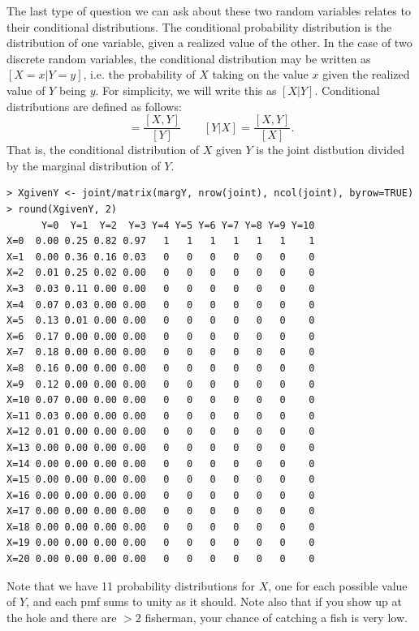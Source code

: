 The last type of question we can ask about these two random variables
relates to their conditional distributions. The
conditional probability distribution is the distribution of one
variable, given a realized value of the other. In the case of two discrete random
variables, the conditional distribution may be written as
$[X=x|Y=y]$, i.e. the probability of $X$ taking on the value $x$
given the realized value of $Y$ being $y$. For simplicity, we will
write this as $[X|Y]$. Conditional distributions are defined as follows:
\begin{equation*}
  [X|Y] = \frac{[X,Y]}{[Y]} \qquad [Y|X] = \frac{[X,Y]}{[X]}.
\end{equation*}
That is, the conditional distribution of $X$ given $Y$ is the joint
distbution divided by the marginal distribution of $Y$.
\begin{verbatim}
> XgivenY <- joint/matrix(margY, nrow(joint), ncol(joint), byrow=TRUE)
> round(XgivenY, 2)
      Y=0  Y=1  Y=2  Y=3 Y=4 Y=5 Y=6 Y=7 Y=8 Y=9 Y=10
X=0  0.00 0.25 0.82 0.97   1   1   1   1   1   1    1
X=1  0.00 0.36 0.16 0.03   0   0   0   0   0   0    0
X=2  0.01 0.25 0.02 0.00   0   0   0   0   0   0    0
X=3  0.03 0.11 0.00 0.00   0   0   0   0   0   0    0
X=4  0.07 0.03 0.00 0.00   0   0   0   0   0   0    0
X=5  0.13 0.01 0.00 0.00   0   0   0   0   0   0    0
X=6  0.17 0.00 0.00 0.00   0   0   0   0   0   0    0
X=7  0.18 0.00 0.00 0.00   0   0   0   0   0   0    0
X=8  0.16 0.00 0.00 0.00   0   0   0   0   0   0    0
X=9  0.12 0.00 0.00 0.00   0   0   0   0   0   0    0
X=10 0.07 0.00 0.00 0.00   0   0   0   0   0   0    0
X=11 0.03 0.00 0.00 0.00   0   0   0   0   0   0    0
X=12 0.01 0.00 0.00 0.00   0   0   0   0   0   0    0
X=13 0.00 0.00 0.00 0.00   0   0   0   0   0   0    0
X=14 0.00 0.00 0.00 0.00   0   0   0   0   0   0    0
X=15 0.00 0.00 0.00 0.00   0   0   0   0   0   0    0
X=16 0.00 0.00 0.00 0.00   0   0   0   0   0   0    0
X=17 0.00 0.00 0.00 0.00   0   0   0   0   0   0    0
X=18 0.00 0.00 0.00 0.00   0   0   0   0   0   0    0
X=19 0.00 0.00 0.00 0.00   0   0   0   0   0   0    0
X=20 0.00 0.00 0.00 0.00   0   0   0   0   0   0    0
\end{verbatim}
Note that we have 11 probability distributions for $X$, one for each
possible value of $Y$, and each pmf sums to unity as it should. Note
also that if you show up at the hole and there are $>2$
fisherman, your chance of catching a fish is very low.

